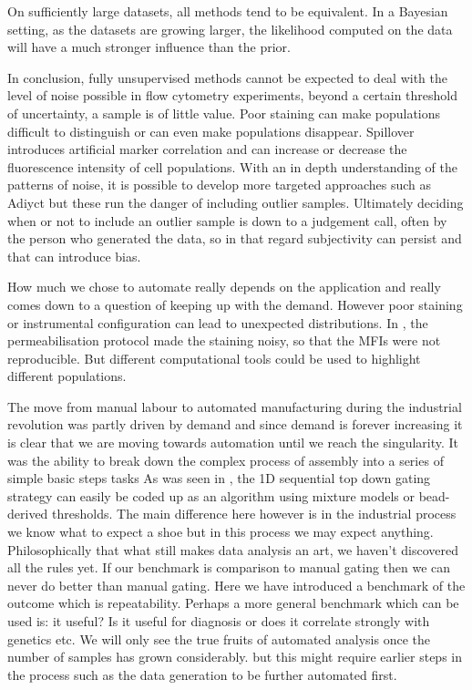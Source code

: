 On sufficiently large datasets, all methods tend to be equivalent.
In a Bayesian setting, as the datasets are growing larger, the likelihood computed on the data will have a much stronger influence than the prior.

In conclusion, fully unsupervised methods cannot be expected to deal with the level of noise possible in flow cytometry experiments, beyond a certain threshold of uncertainty, a sample is of little value.
Poor staining can make populations difficult to distinguish or can even make populations disappear.
Spillover introduces artificial marker correlation and can increase or decrease the fluorescence intensity of cell populations.  
With an in depth understanding of the patterns of noise, it is possible to develop more targeted approaches such as Adiyct but these run the danger of including outlier samples.
Ultimately deciding when or not to include an outlier sample is down to a judgement call, often by the person who generated the data, so in that regard subjectivity can persist and that can introduce bias.


How much we chose to automate really depends on the application and really comes down to a question of keeping up with the demand.
However poor staining or instrumental configuration can lead to unexpected distributions.
In , the permeabilisation protocol made the staining noisy, so that the MFIs were not reproducible.
But different computational tools could be used to highlight different populations.

The move from manual labour to automated manufacturing during the industrial revolution was partly driven by demand and since demand is forever increasing it is clear that we are moving towards automation until we reach the singularity.
It was the ability to break down the complex process of assembly into a series of simple basic steps tasks 
As was seen in , the 1D sequential top down gating strategy can easily be coded up as an algorithm using mixture models or bead-derived thresholds.  
The main difference here however is in the industrial process we know what to expect a shoe but in this process we may expect anything.
Philosophically that what still makes data analysis an art, we haven't discovered all the rules yet.
If our benchmark is comparison to manual gating then we can never do better than manual gating.
Here we have introduced a benchmark of the outcome which is repeatability.
Perhaps a more general benchmark which can be used is: it useful?
Is it useful for diagnosis or does it correlate strongly with genetics etc.
We will only see the true fruits of automated analysis once the number of samples has grown considerably.
but this might require earlier steps in the process such as the data generation to be further automated first.









